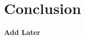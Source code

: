 \documentclass[sigconf]{aamas}  %
\theoremstyle{definition}
\theoremstyle{definition}
\begin{document}
\section{Conclusion}\label{sec:conclusion}
\textbf{Add Later}




\end{document}
